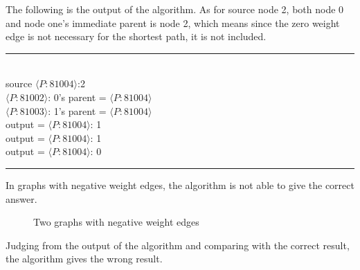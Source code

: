 \documentclass[11pt]{article}  %
\begin{document}
The following is the output of the algorithm. As for source node 2, both node 0 and node one's immediate parent is node 2, which means since the zero weight edge is not necessary for the shortest path, it is not included.\par
\noindent
\rule{3in}{.1pt}
\noindent \\
source $\langle P:81004\rangle$:2\\
$\langle P:81002\rangle$: 0's parent =  $\langle P:81004\rangle$\\
$\langle P:81003\rangle$: 1's parent =  $\langle P:81004\rangle$\\
output = {$\langle P:81004\rangle$: 1}\\
output = {$\langle P:81004\rangle$: 1}\\
output = {$\langle P:81004\rangle$: 0}\\
\rule{3in}{.1pt}\par

In graphs with negative weight edges, the algorithm is not able to give the correct answer. \par

\begin{figure}[htbp]
\centering
{}
\quad
{}
\caption{ Two graphs with negative weight edges}
\end{figure}\par

Judging from the output of the algorithm and comparing with the correct result, the algorithm gives the wrong result.\par
\end{document}
